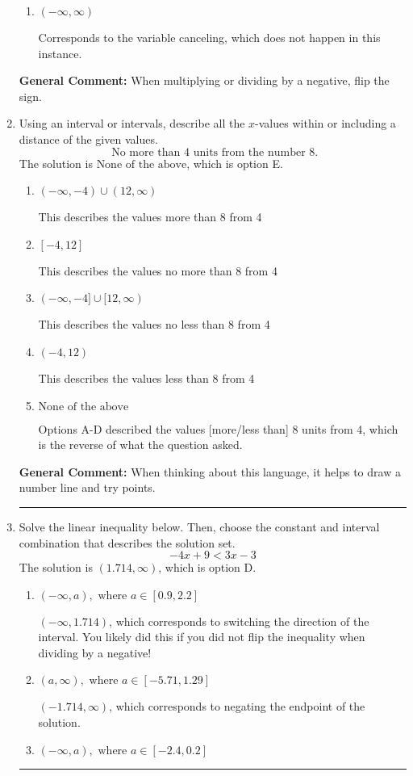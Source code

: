\documentclass{extbook}[14pt]
\newcommand{\litem}[1]{\item #1

\rule{\textwidth}{0.4pt}}
\begin{document}
\begin{enumerate}
{\begin{enumerate}[label=\Alph*.]
Corresponds to including the endpoints AND negating.
\item \( (-\infty, \infty) \)

Corresponds to the variable canceling, which does not happen in this instance.
\end{enumerate}

\textbf{General Comment:} When multiplying or dividing by a negative, flip the sign.
}
\litem{
Using an interval or intervals, describe all the $x$-values within or including a distance of the given values.
\[ \text{ No more than } 4 \text{ units from the number } 8. \]The solution is \( \text{None of the above} \), which is option E.\begin{enumerate}[label=\Alph*.]
\item \( (-\infty, -4) \cup (12, \infty) \)

This describes the values more than 8 from 4
\item \( [-4, 12] \)

This describes the values no more than 8 from 4
\item \( (-\infty, -4] \cup [12, \infty) \)

This describes the values no less than 8 from 4
\item \( (-4, 12) \)

This describes the values less than 8 from 4
\item \( \text{None of the above} \)

Options A-D described the values [more/less than] 8 units from 4, which is the reverse of what the question asked.
\end{enumerate}

\textbf{General Comment:} When thinking about this language, it helps to draw a number line and try points.
}
\litem{
Solve the linear inequality below. Then, choose the constant and interval combination that describes the solution set.
\[ -4x + 9 < 3x -3 \]The solution is \( (1.714, \infty) \), which is option D.\begin{enumerate}[label=\Alph*.]
\item \( (-\infty, a), \text{ where } a \in [0.9, 2.2] \)

 $(-\infty, 1.714)$, which corresponds to switching the direction of the interval. You likely did this if you did not flip the inequality when dividing by a negative!
\item \( (a, \infty), \text{ where } a \in [-5.71, 1.29] \)

 $(-1.714, \infty)$, which corresponds to negating the endpoint of the solution.
\item \( (-\infty, a), \text{ where } a \in [-2.4, 0.2] \)


\end{enumerate}}
\end{enumerate}
\end{document}
